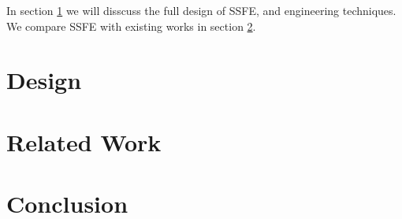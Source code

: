 \documentclass{article}
\begin{document}

In section \ref{sec:design} we will disscuss the full design of SSFE, and engineering techniques. We compare SSFE with existing works in section \ref{sec:related_work}.

\section{Design}
\label{sec:design}


\section{Related Work}
\label{sec:related_work}


\section{Conclusion}




\end{document}

